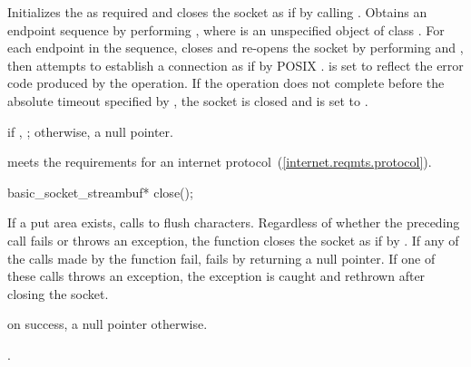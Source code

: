 \begin{itemdescr}
\pnum
\effects Initializes the  as required and closes the socket as if by calling . Obtains an endpoint sequence  by performing , where  is an unspecified object of class . For each endpoint  in the sequence, closes and re-opens the socket by performing  and , then attempts to establish a connection as if by POSIX .  is set to reflect the error code produced by the operation. If the operation does not complete before the absolute timeout specified by , the socket is closed and  is set to .

\pnum
\returns if , ; otherwise, a null pointer.


\pnum
{}
 meets the requirements for an internet protocol~(\ref{internet.reqmts.protocol}).
\end{itemdescr}

\begin{itemdecl}
basic_socket_streambuf* close();
\end{itemdecl}

\begin{itemdescr}
\pnum
\effects If a put area exists, calls  to flush characters. Regardless of whether the preceding call fails or throws an exception, the function closes the socket as if by . If any of the calls made by the function fail,  fails by returning a null pointer. If one of these calls throws an exception, the exception is caught and rethrown after closing the socket.

\pnum
\returns {} on success, a null pointer otherwise.

\pnum
\postconditions {}.
\end{itemdescr}

